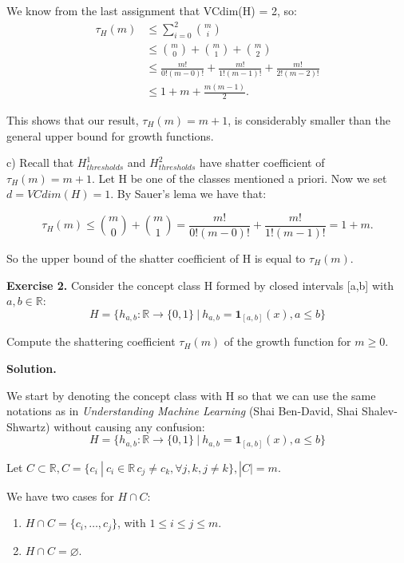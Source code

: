 \documentclass{article}
\newcommand{\<}{\langle}
\renewcommand{\>}{\rangle}
\theoremstyle{definition}
\begin{document}
We know from the last assignment that VCdim(H) = 2, so:
\[
\begin{aligned}
    \tau_H(m) & \leq \sum_{i=0}^{2} {m \choose i}\\
    & \leq {m \choose 0} + {m \choose 1} + {m \choose 2}\\
    & \leq \frac{m!}{0!(m-0)!} + \frac{m!}{1!(m-1)!} + \frac{m!}{2!(m-2)!} \\
    & \leq 1 + m + \frac{m(m-1)}{2}.
\end{aligned}
\]

This shows that our result, $\tau_H(m) = m + 1$, is considerably smaller than the general upper bound for growth functions.

c) Recall that $H_{thresholds}^{1}$ and $H_{thresholds}^{2}$ have shatter coefficient of $\tau_H(m) = m + 1$. Let H be one of the classes mentioned a priori. Now we set $d = VCdim(H) = 1$. By Sauer's lema we have that:

$$\tau_H(m) \leq {m \choose 0} + {m \choose 1} = \frac{m!}{0!(m-0)!} + \frac{m!}{1!(m-1)!} = 1 + m.$$ 

So the upper bound of the shatter coefficient of H is equal to $\tau_H(m)$.

\vspace{3mm}

\textbf{Exercise 2.} Consider the concept class H formed by closed intervals [a,b] with $a,b \in \mathbb{R}$:
\vspace{-1mm}
$$H = \{h_{a,b} : \mathbb{R} \rightarrow \{0, 1\} \ | \ h_{a,b} = \textbf{1}_{[a,b]}(x), a \leq b\}$$

Compute the shattering coefficient $\tau_H(m)$ of the growth function for $m \geq 0$.

\textbf{Solution.}

We start by denoting the concept class with H so that we can use the same notations as in \textit{Understanding Machine Learning} (Shai Ben-David, Shai Shalev-Shwartz) without causing any confusion: 
\vspace{-1mm}
$$H = \{h_{a,b} : \mathbb{R} \rightarrow \{0, 1\} \ | \ h_{a,b} = \textbf{1}_{[a,b]}(x), a \leq b\}$$

Let $C \subset \mathbb{R}, C = \{c_i \ | \ c_i \in \mathbb{R} \, c_j \neq c_k, \forall j,k, j \neq k\},|C| = m$.

We have two cases for $H \cap C$:

\begin{enumerate}
    \item $H \cap C = \{c_i, \dots , c_j\}$, with $1 \leq i \leq j \leq m$. 
    \item $H \cap C = \varnothing$. 
\end{enumerate}
\end{document}
